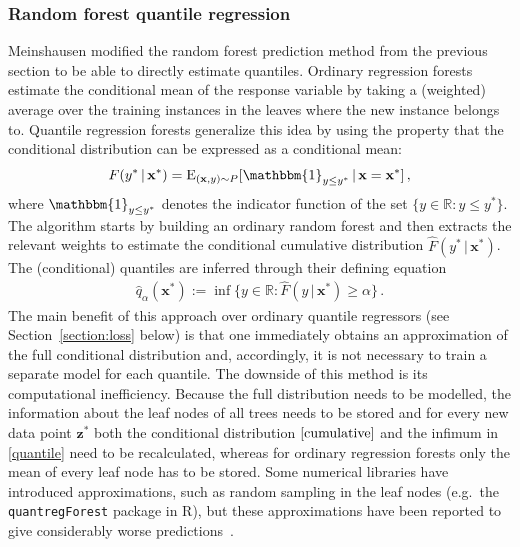 \documentclass[smallcondensed]{svjour3}
\begin{document}
\subsubsection*{Random forest quantile regression}

    Meinshausen \cite{meinshausen2006quantile} modified the random forest prediction method from the previous section to be able to directly estimate quantiles. Ordinary regression forests estimate the conditional mean of the response variable by taking a (weighted) average over the training instances in the leaves where the new instance belongs to. Quantile regression forests generalize this idea by using the property that the conditional distribution can be expressed as a conditional mean:
    \begin{gather}
        \label{cumulative}
        F(y^*\,|\,\mathbf{x}^*) = \mathrm{E}_{(\mathbf{x},y)\sim P}[\mathbbm{1}_{y\leq y^*}\,|\,\mathbf{x}=\mathbf{x}^*]\,,
    \end{gather}
    where $\mathbbm{1}_{y\leq y^*}$ denotes the indicator function of the set $\{y\in\mathbb{R}:y\leq y^*\}$. The algorithm starts by building an ordinary random forest and then extracts the relevant weights to estimate the conditional cumulative distribution $\hat{F}(y^*\,|\,\mathbf{x}^*)$. The (conditional) quantiles are inferred through their defining equation
    \begin{gather}
        \label{quantile}
        \hat{q}_\alpha(\mathbf{x}^*) := \inf\{y\in\mathbb{R}:\hat{F}(y\,|\,\mathbf{x}^*)\geq\alpha\}\,.
    \end{gather}
    The main benefit of this approach over ordinary quantile regressors (see Section~\ref{section:loss} below) is that one immediately obtains an approximation of the full conditional distribution and, accordingly, it is not necessary to train a separate model for each quantile. The downside of this method is its computational inefficiency. Because the full distribution needs to be modelled, the information about the leaf nodes of all trees needs to be stored and for every new data point $\mathbf{z}^*$ both the conditional distribution $\eqref{cumulative}$ and the infimum in \eqref{quantile} need to be recalculated, whereas for ordinary regression forests only the mean of every leaf node has to be stored. Some numerical libraries have introduced approximations, such as random sampling in the leaf nodes (e.g.\ the \texttt{quantregForest} package in R), but these approximations have been reported to give considerably worse predictions~\cite{quantreg}.
\end{document}
